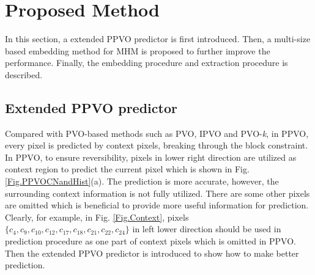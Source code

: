 \documentclass[review,3p,10pt,sort&compress]{elsarticle}
\begin{document}
\section{Proposed Method}\label{sec:3}
In this section, a extended PPVO predictor is first introduced. Then, a multi-size based embedding method for MHM is proposed to further improve the performance. Finally, the embedding procedure and extraction procedure is described.

\subsection{Extended PPVO predictor}\label{sec:3.1}
Compared with PVO-based methods such as PVO\cite{Li2013PVO}, IPVO\cite{Peng2014IPVO} and PVO-\emph{k}\cite{Ou2014PVOk}, in PPVO, every pixel is predicted by context pixels, breaking through the block constraint. In PPVO, to ensure reversibility, pixels in lower right direction are utilized as context region to predict the current pixel which is shown in Fig. \ref{Fig.PPVOCNandHist}(a). The prediction is more accurate, however, the surrounding context information is not fully utilized. There are some other pixels are omitted which is beneficial to provide more useful information for prediction. Clearly, for example, in Fig. \ref{Fig.Context}, pixels $\{c_{4}, c_{9}, c_{10}, c_{12}, c_{17}, c_{18}, c_{21}, c_{22}, c_{24}\}$ in left lower direction should be used in prediction procedure as one part of context pixels which is omitted in PPVO. Then the extended PPVO predictor is introduced to show how to make better prediction.
\end{document}
